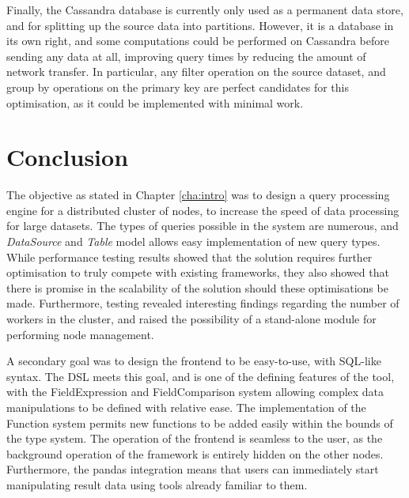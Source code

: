 Finally, the Cassandra database is currently only used as a permanent data store, and for splitting up the source data into partitions. However, it is a database in its own right, and some computations could be performed on Cassandra before sending any data at all, improving query times by reducing the amount of network transfer. In particular, any filter operation on the source dataset, and group by operations on the primary key are perfect candidates for this optimisation, as it could be implemented with minimal work.


\section{Conclusion}
The objective as stated in Chapter \ref{cha:intro} was to design a query processing engine for a distributed cluster of nodes, to increase the speed of data processing for large datasets. The types of queries possible in the system are numerous, and \textit{DataSource} and \textit{Table} model allows easy implementation of new query types. While performance testing results showed that the solution requires further optimisation to truly compete with existing frameworks, they also showed that there is promise in the scalability of the solution should these optimisations be made. Furthermore, testing revealed interesting findings regarding the number of workers in the cluster, and raised the possibility of a stand-alone module for performing node management. 

A secondary goal was to design the frontend to be easy-to-use, with SQL-like syntax. The DSL meets this goal, and is one of the defining features of the tool, with the FieldExpression and FieldComparison system allowing complex data manipulations to be defined with relative ease. The implementation of the Function system permits new functions to be added easily within the bounds of the type system. The operation of the frontend is seamless to the user, as the background operation of the framework is entirely hidden on the other nodes. Furthermore, the pandas integration means that users can immediately start manipulating result data using tools already familiar to them.